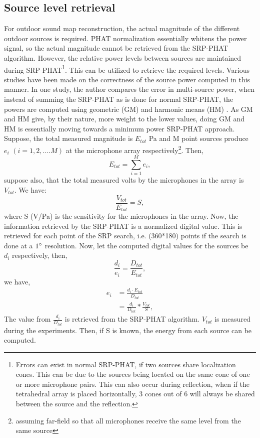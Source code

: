 \subsection{Source level retrieval}\label{srcLvlRetrieval}
For outdoor sound map reconstruction, the actual magnitude of the different outdoor sources is required. PHAT normalization essentially whitens the power signal, so the actual magnitude cannot be retrieved from the SRP-PHAT algorithm. However, the relative power levels between sources are maintained during SRP-PHAT\footnote{Errors can exist in normal SRP-PHAT, if two sources share localization cones. This can be due to the sources being located on the same cone of one or more microphone pairs. This can also occur during reflection, when if the tetrahedral array is placed horizontally, 3 cones out of 6 will always be shared between the source and the reflection.}.  
This can be utilized to retrieve the required levels. Various studies have been made on the correctness of the source power computed in this manner. In one study, the author compares the error in multi-source power, when instead of summing the SRP-PHAT as is done for normal SRP-PHAT, the powers are computed using geometric (GM) and harmonic means (HM) \cite{padois2016use}. As GM and HM give, by their nature, more weight to the lower values, doing GM and HM is essentially moving towards a minimum power SRP-PHAT approach. 
Suppose, the total measured magnitude is $E_{tot}$ Pa and M point sources produce $e_i$ $(i=1,2,....M)$ at the microphone array respectively\footnote{assuming far-field so that all microphones receive the same level from the same source}. Then, 
\begin{equation}
E_{tot}=\sum\limits_{i=1}^{M}e_i,
\end{equation}
suppose also, that the total measured volts by the microphones in the array is $V_{tot}$. We have:
\begin{equation}
    \frac{V_{tot}}{E_{tot}} = S,
\end{equation}
where S (V/Pa) is the sensitivity for the microphones in the array. Now, the information retrieved by the SRP-PHAT is a normalized digital value. This is retrieved for each point of the SRP search, i.e. (360*180) points if the search is done at a $1\degree$ resolution. Now, let the computed digital values for the sources be $d_i$ respectively, then,
\begin{equation}
    \frac{d_i}{e_i} = \frac{D_{tot}}{E_{tot}}, 
\end{equation}
we have,
\begin{equation}\label{eq:srcLvl}
\begin{split}
    e_i &= \frac{d_i\cdot E_{tot}}{D_{tot}} \\
        &= \frac{d_i}{D_{tot}} * \frac{V_{tot}}{S},
\end{split}
\end{equation}
The value from $\frac{d_i}{D_{tot}}$ is retrieved from the SRP-PHAT algorithm. $V_{tot}$ is measured during the experiments. Then, if S is known, the energy from each source can be computed. 
